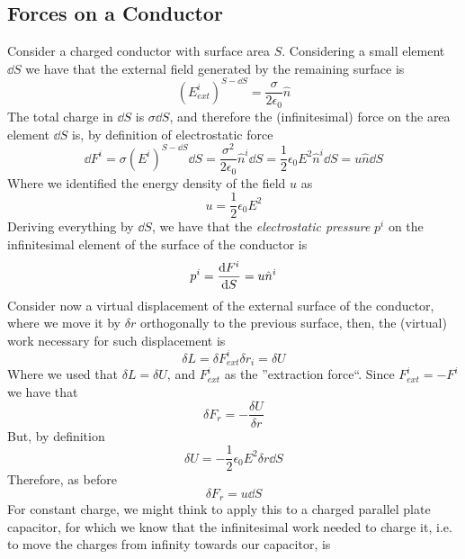 \documentclass[../electromagnetism]{subfiles}
\begin{document}
\subsection{Forces on a Conductor}
Consider a charged conductor with surface area $S$. Considering a small element $\dd S$ we have that the external field generated by the remaining surface is
\begin{equation*}
	\left( E^i_{ext} \right)^{S-\dd S}=\frac{\sigma}{2\epsilon_0}\hat{n}
\end{equation*}
The total charge in $\dd S$ is $\sigma\dd S$, and therefore the (infinitesimal) force on the area element $\dd S$ is, by definition of electrostatic force
\begin{equation}
	\dd F^i=\sigma\left({E}^i\right)^{S-\dd S}\dd S=\frac{\sigma^2}{2\epsilon_0}\hat{n}^i\dd S=\frac{1}{2}\epsilon_0E^2\hat{n}^i\dd S=u\hat{n}\dd S
	\label{eq:forceonds}
\end{equation}
Where we identified the energy density of the field $u$ as
\begin{equation*}
	u=\frac{1}{2}\epsilon_0E^2
\end{equation*}
Deriving everything by $\dd S$, we have that the \textit{electrostatic pressure} $p^i$ on the infinitesimal element of the surface of the conductor is
\begin{equation}
	p^i=\dv{F^i}{S}=u\hat{n}^i
	\label{eq:elpressure}
\end{equation}
Consider now a virtual displacement of the external surface of the conductor, where we move it by $\delta r$ orthogonally to the previous surface, then, the (virtual) work necessary for such displacement is
\begin{equation*}
	\delta L=\delta F^i_{ext}\delta r_i=\delta U
\end{equation*}
Where we used that $\delta L=\delta U$, and $F^i_{ext}$ as the ''extraction force``. Since $F^i_{ext}=-F^i$ we have that
\begin{equation*}
	\delta F_r=-\frac{\delta U}{\delta r}
\end{equation*}
But, by definition
\begin{equation*}
	\delta U=-\frac{1}{2}\epsilon_0E^2\delta r\dd S
\end{equation*}
Therefore, as before
\begin{equation*}
	\delta F_r=u\dd S
\end{equation*}
For constant charge, we might think to apply this to a charged parallel plate capacitor, for which we know that the infinitesimal work needed to charge it, i.e. to move the charges from infinity towards our capacitor, is
\end{document}
